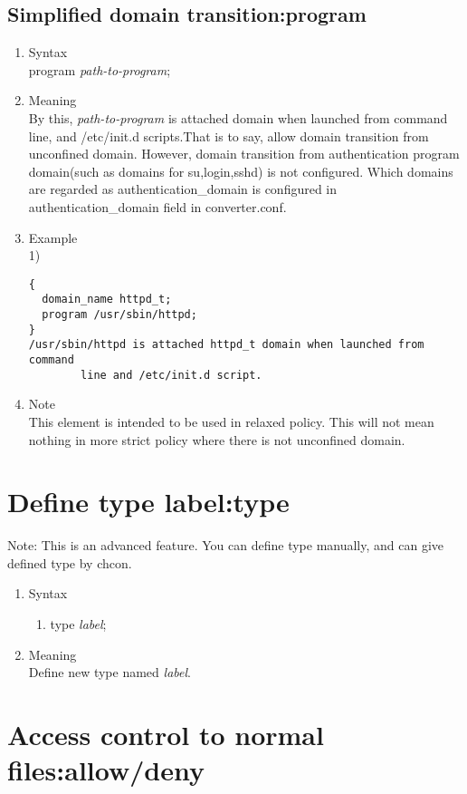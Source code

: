 \documentclass{article}
\begin{document}
\subsection{Simplified domain transition:program}\label{sec:program}
\begin{enumerate}
 \item Syntax\\
    program {\it path-to-program};
 \item Meaning\\
       By this,
       {\it path-to-program} is attached domain when launched from
       command line, and /etc/init.d scripts.That is to
       say, allow domain transition from unconfined domain. 
    However, domain transition from authentication program domain(such as
       domains for su,login,sshd) is not configured. Which domains are
       regarded as authentication\_domain is configured in
       authentication\_domain field in converter.conf.\\
 \item Example\\
1)
\begin{verbatim}
{
  domain_name httpd_t;
  program /usr/sbin/httpd;
}
/usr/sbin/httpd is attached httpd_t domain when launched from command
		line and /etc/init.d script.
\end{verbatim}
 \item Note\\
    This element is intended to be used in relaxed policy. This will not
       mean nothing in more strict policy where there is not unconfined domain.
\end{enumerate}

\section{Define type label:type}
Note: This is an advanced feature. 
You can define type manually, and can give defined type by chcon.
\begin{enumerate}
	\item Syntax
		\begin{enumerate}
		\item type {\it label};
		\end{enumerate}
	\item Meaning\\
		Define new type named {\it label}.
\end{enumerate}


\section{Access control to normal files:allow/deny}
\end{document}
